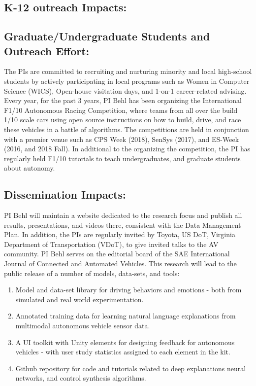 \subsection{K-12 outreach Impacts:}

\subsection{Graduate/Undergraduate Students and Outreach Effort:}
The PIs are committed to recruiting and nurturing minority and local high-school students by actively participating in local programs such as Women in Computer Science (WICS),  Open-house visitation days, and 1-on-1 career-related advising.
Every year, for the past 3 years, PI Behl has been organizing the International F1/10 Autonomous Racing Competition, where teams from all over the build 1/10 scale cars using open source instructions on how to build, drive, and race these vehicles in a battle of algorithms. The competitions are held in conjunction with a premier venue such as CPS Week (2018), SenSys (2017), and ES-Week (2016, and 2018 Fall). In additional to the organizing the competition, the PI has regularly held F1/10 tutorials to teach undergraduates, and graduate students about autonomy.  

\subsection{Dissemination Impacts:}
PI Behl will maintain a website dedicated to the research focus and publish all results, presentations, and videos there, consistent with the Data Management Plan. 
In addition, the PIs are regularly invited by Toyota, US DoT, Virginia Department of Transportation (VDoT), to give invited talks to the AV community.
PI Behl serves on the editorial board of the SAE International Journal of Connected and Automated Vehicles.
This research will lead to the public release of a number of models, data-sets, and tools:
\begin{enumerate}
    \item Model and data-set library for driving behaviors and emotions - both from simulated and real world experimentation. 
    \item Annotated training data for learning natural language explanations from multimodal autonomous vehicle sensor data.
    \item A UI toolkit with Unity elements for designing feedback for autonomous vehicles - with user study statistics assigned to each element in the kit.
    \item Github repository for code and tutorials related to deep explanations neural networks, and control synthesis algorithms. 
\end{enumerate}